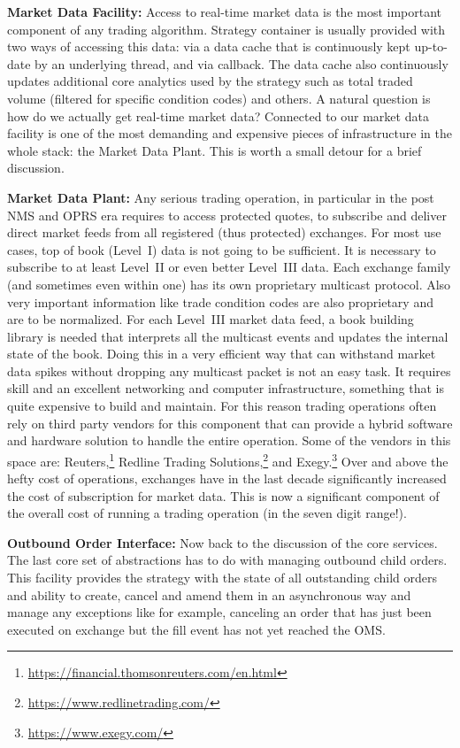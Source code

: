 \noindent\textbf{Market Data Facility:} Access to real-time market data is the most important component of any trading algorithm. Strategy container is usually provided with two ways of accessing this data: via a data cache that is continuously kept up-to-date by an underlying thread, and via callback. The data cache also continuously updates additional core analytics used by the strategy such as total traded volume (filtered for specific condition codes) and others. A natural question is how do we actually get real-time market data? Connected to our market data facility is one of the most demanding and expensive pieces of infrastructure in the whole stack: the Market Data Plant. This is worth a small detour for a brief discussion. \twomedskip


\noindent\textbf{Market Data Plant:}  Any serious trading operation, in particular in the post NMS and OPRS era requires to access protected quotes, to subscribe and deliver direct market feeds from all registered (thus protected) exchanges. For most use cases, top of book (Level~I) data is not going to be sufficient. It is necessary to subscribe to at least Level~II or even better Level~III data. Each exchange family (and sometimes even within one) has its own proprietary multicast protocol. Also very important information like trade condition codes are also proprietary and are to be normalized. For each Level~III market data feed, a book building library is needed that interprets all the multicast events and updates the internal state of the book. Doing this in a very efficient way that can withstand market data spikes without dropping any multicast packet is not an easy task. It requires skill and an excellent networking and computer infrastructure, something that is quite expensive to build and maintain. For this reason trading operations often rely on third party vendors for this component that can provide a hybrid software and hardware solution to handle the entire operation. Some of the vendors in this space are: Reuters,\footnote{\url{https://financial.thomsonreuters.com/en.html}} Redline Trading Solutions,\footnote{\url{https://www.redlinetrading.com/}} and Exegy.\footnote{\url{https://www.exegy.com/}} Over and above the hefty cost of operations, exchanges have in the last decade significantly increased the cost of subscription for market data. This is now a significant component of the overall cost of running a trading operation (in the seven digit range!). \twomedskip


\noindent\textbf{Outbound Order Interface:} Now back to the discussion of the core services. The last core set of abstractions has to do with managing outbound child orders. This facility provides the strategy with the state of all outstanding child orders and ability to create, cancel and amend them in an asynchronous way and manage any exceptions like for example, canceling an order that has just been executed on exchange but the fill event has not yet reached the OMS. \twomedskip


